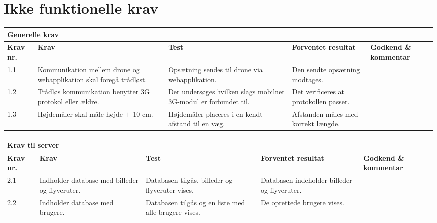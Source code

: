 \chapter{Ikke funktionelle krav}

    \centering
    \begin{tabular}{|p{}|p{3.2 cm}|p{3.2 cm}|p{3.2 cm}|p{2.2 cm}|}
			\hline
			\multicolumn{5}{|l|}{\textbf{{\large Generelle krav}}}\\ \hline
			\textbf{Krav nr.} & \textbf{Krav} & \textbf{Test} & \textbf{Forventet \newline resultat} & 			
			\textbf{Godkend \& \newline kommentar} \\ \hline
			
			1.1 & Kommunikation mellem drone og webapplikation skal foregå trådløst.
				& Opsætning sendes til drone via webapplikation.
				& Den sendte opsætning modtages.
				& \\ \hline

			1.2 & Trådløs kommunikation benytter 3G protokol eller ældre. 
				& Der undersøges hvilken slags mobilnet 3G-modul er forbundet til.
				& Det verificeres at protokollen passer.
				&  \\ \hline
			
			1.3 & Højdemåler skal måle højde $\pm$ 10 cm.
				& Højdemåler placeres i en kendt afstand til en væg.
				& Afstanden måles med korrekt længde.
				& \\ \hline						
		\end{tabular}

\vspace{2cm}

    \centering
    \begin{tabular}{|p{}|p{3.2 cm}|p{3.2 cm}|p{3.2 cm}|p{2.2 cm}|}
			\hline
			\multicolumn{5}{|l|}{\textbf{{\large Krav til server}}}\\ \hline
			\textbf{Krav nr.} & \textbf{Krav} & \textbf{Test} & \textbf{Forventet \newline resultat} & 			
			\textbf{Godkend \& \newline kommentar} \\ \hline
			
			2.1 & Indholder database med billeder og flyveruter.
				& Databasen tilgås, billeder og flyveruter vises.
				& Databasen indeholder billeder og flyveruter.
				& \\ \hline

			2.2 & Indholder database med brugere.
				& Databasen tilgås og en liste med alle brugere vises.
				& De oprettede brugere vises.
				&  \\ \hline			
		\end{tabular}



